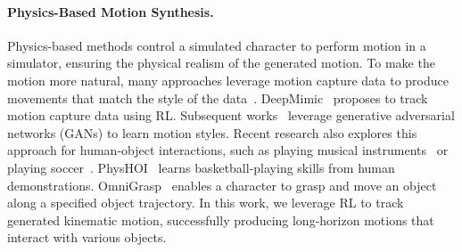 
\paragraph{Physics-Based Motion Synthesis.}
Physics-based methods control a simulated character to perform motion in a simulator, ensuring the physical realism of the generated motion. To make the motion more natural, many approaches leverage motion capture data to produce movements that match the style of the data~\cite{peng2018deepmimic, peng2021amp, peng2023hoi, liu2018learning}. DeepMimic~\cite{peng2018deepmimic} proposes to track motion capture data using RL. Subsequent works~\cite{peng2021amp, xu2021gan} leverage generative adversarial networks (GANs) to learn motion styles. Recent research also explores this approach for human-object interactions, such as playing musical instruments~\cite{xu2024synchronize, wang2024f} or playing soccer~\cite{xie2022learning}.  PhysHOI~\cite{wang2023physhoi} learns basketball-playing skills from human demonstrations. OmniGrasp~\cite{luo2024grasping} enables a character to grasp and move an object along a specified object trajectory.
In this work, we leverage RL to track generated kinematic motion, successfully producing long-horizon motions that interact with various objects.

